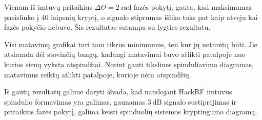 \documentclass[main.tex]{subfiles}
\begin{document}
Vienam iš imtuvų pritaikius $\Delta \Theta = 2\ \mathrm{rad}$ fazės pokytį, gauta, kad
maksimumas pasislinko į 40 laipsnių kryptį, o signalo stiprumas išliko toks pat kaip atveju
kai fazės pokyčio
nebuvo. Šis rezultatas sutampa su  lygties rezultatu.

Visi matavimų grafikai turi tam tikrus minimumus, ten kur jų neturėtų būti. Jie atsiranda
dėl stovinčių bangų, kadangi matavimai buvo atlikti patalpoje nuo kurios sienų vyksta
atspindžiai. Norint gauti tikslines spinduliavimo diagramas, matavimus reiktų
atlikti patalpoje, kurioje nėra atspindžių.

Iš gautų rezultatų galime daryti išvada, kad naudojant HackRF imtuvus spindulio formavimas
yra galimas, gaunamas $3\ \mathrm{dB}$ signalo sustiprėjimas ir pritaikius fazės pokytį,
galima keisti spinduolių sistemos kryptingumo diagramą.
\end{document}
